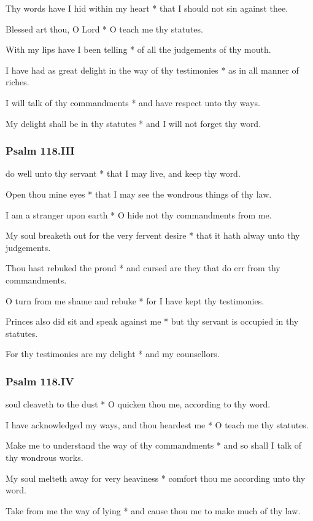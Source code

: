 Thy words have I hid within my heart * that I should not sin against thee.

Blessed art thou, O Lord * O teach me thy statutes.

With my lips have I been telling * of all the judgements of thy mouth.

I have had as great delight in the way of thy testimonies * as in all manner of riches.

I will talk of thy commandments * and have respect unto thy ways.

My delight shall be in thy statutes * and I will not forget thy word.

\subsubsection{Psalm 118.III}

 do well unto thy servant * that I may live, and keep thy word.

Open thou mine eyes * that I may see the wondrous things of thy law.

I am a stranger upon earth * O hide not thy commandments from me.

My soul breaketh out for the very fervent desire * that it hath alway unto thy judgements.

Thou hast rebuked the proud * and cursed are they that do err from thy commandments.

O turn from me shame and rebuke * for I have kept thy testimonies.

Princes also did sit and speak against me * but thy servant is occupied in thy statutes.

For thy testimonies are my delight * and my counsellors.

\subsubsection{Psalm 118.IV}

 soul cleaveth to the dust * O quicken thou me, according to thy word.

I have acknowledged my ways, and thou heardest me * O teach me thy statutes.

Make me to understand the way of thy commandments * and so shall I talk of thy wondrous works.

My soul melteth away for very heaviness * comfort thou me according unto thy word.

Take from me the way of lying * and cause thou me to make much of thy law.

